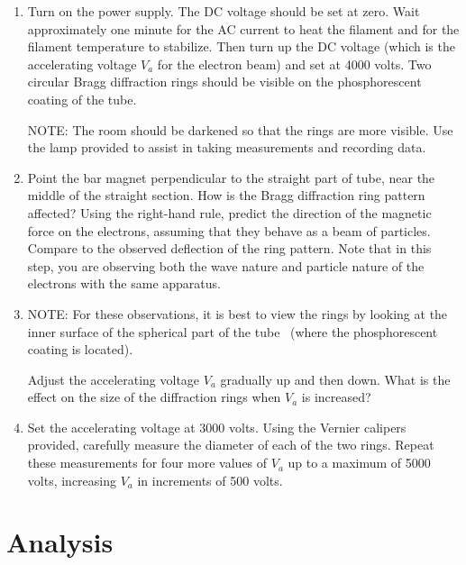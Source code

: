 \documentclass{article}
\begin{document}
\begin{enumerate}
\item Turn on the power supply. The DC voltage should be set at zero.
Wait approximately one minute for the AC current to heat the filament
and for the filament temperature to stabilize.  Then turn up the DC
voltage (which is the accelerating voltage $V_a$ for the
electron beam) and set at 4000 volts.  Two circular Bragg diffraction
rings should be visible on the phosphorescent coating of the tube.

NOTE: The room should be darkened so that the rings are more visible.
 Use the lamp provided to assist in taking measurements and recording
data.

\item Point the bar magnet perpendicular to the straight part of tube,
near the middle of the straight section.  How is the Bragg diffraction
ring pattern affected?  Using the right-hand rule, predict the
direction of the magnetic force on the electrons, assuming that they
behave as a beam of particles.  Compare to the observed deflection of
the ring pattern.  Note that in this step, you are observing both
the wave nature and particle nature of the electrons with the same
apparatus.

\item NOTE: For these observations, it is best to view the rings by
looking at the inner surface of the spherical part of the tube \ (where
the phosphorescent coating is located).

Adjust the accelerating voltage $V_a$  gradually up and
then down.  What is the effect on the size of the diffraction rings
when $V_a$ is increased?

\item Set the accelerating voltage at 3000 volts.  Using the Vernier
calipers provided, carefully measure the diameter of each of the two rings.  Repeat these
measurements for four more values of $V_a$ up to a
maximum of 5000 volts, increasing $V_a$ in increments of
500 volts.
\end{enumerate}

\section{Analysis}
\end{document}
